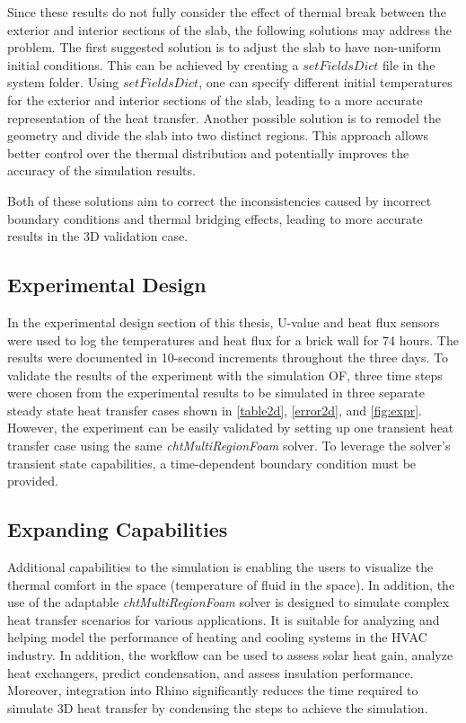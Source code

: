 Since these results do not fully consider the effect of thermal break between the exterior and interior sections of the slab, the following solutions may address the problem. The first suggested solution is to adjust the slab to have non-uniform initial conditions. This can be achieved by creating a $setFieldsDict$ file in the system folder. Using $setFieldsDict$, one can specify different initial temperatures for the exterior and interior sections of the slab, leading to a more accurate representation of the heat transfer. Another possible solution is to remodel the geometry and divide the slab into two distinct regions. This approach allows better control over the thermal distribution and potentially improves the accuracy of the simulation results.

Both of these solutions aim to correct the inconsistencies caused by incorrect boundary conditions and thermal bridging effects, leading to more accurate results in the 3D validation case.

\subsection{Experimental Design}
In the experimental design section of this thesis, U-value and heat flux sensors were used to log the temperatures and heat flux for a brick wall for 74 hours. The results were documented in 10-second increments throughout the three days. To validate the results of the experiment with the simulation \gls{OF}, three time steps were chosen from the experimental results to be simulated in three separate steady state heat transfer cases shown in \ref{table2d}, \ref{error2d}, and \ref{fig:expr}. However, the experiment can be easily validated by setting up one transient heat transfer case using the same \textit{chtMultiRegionFoam} solver. To leverage the solver's transient state capabilities, a time-dependent boundary condition must be provided. 


\subsection{Expanding Capabilities} %
Additional capabilities to the simulation is enabling the users to visualize the thermal comfort in the space (temperature of fluid in the space). In addition, the use of the adaptable \textit{chtMultiRegionFoam} solver is designed to simulate complex heat transfer scenarios for various applications. It is suitable for analyzing and helping model the performance of heating and cooling systems in the HVAC industry. In addition, the workflow can be used to assess solar heat gain, analyze heat exchangers, predict condensation, and assess insulation performance. Moreover, integration into Rhino significantly reduces the time required to simulate 3D heat transfer by condensing the steps to achieve the simulation.



